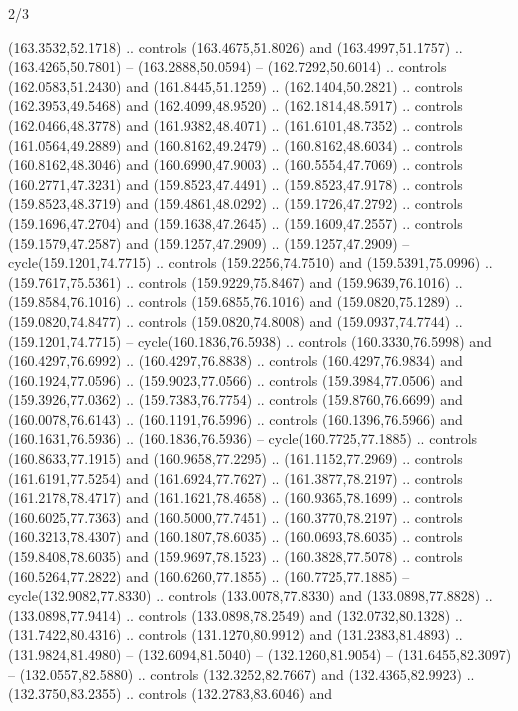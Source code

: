 \begin{flagdescription}{2/3}
\begin{scope}[xshift=0.5\flaglength,yshift=0.5\flagwidth,scale=\flagwidth/180]
\begin{scope}[y=0.8pt, x=0.8pt, yscale=-1,shift={(-168.75,-108.75)}]
  (163.3532,52.1718) .. controls (163.4675,51.8026) and (163.4997,51.1757) ..
  (163.4265,50.7801) -- (163.2888,50.0594) -- (162.7292,50.6014) .. controls
  (162.0583,51.2430) and (161.8445,51.1259) .. (162.1404,50.2821) .. controls
  (162.3953,49.5468) and (162.4099,48.9520) .. (162.1814,48.5917) .. controls
  (162.0466,48.3778) and (161.9382,48.4071) .. (161.6101,48.7352) .. controls
  (161.0564,49.2889) and (160.8162,49.2479) .. (160.8162,48.6034) .. controls
  (160.8162,48.3046) and (160.6990,47.9003) .. (160.5554,47.7069) .. controls
  (160.2771,47.3231) and (159.8523,47.4491) .. (159.8523,47.9178) .. controls
  (159.8523,48.3719) and (159.4861,48.0292) .. (159.1726,47.2792) .. controls
  (159.1696,47.2704) and (159.1638,47.2645) .. (159.1609,47.2557) .. controls
  (159.1579,47.2587) and (159.1257,47.2909) .. (159.1257,47.2909) --
  cycle(159.1201,74.7715) .. controls (159.2256,74.7510) and (159.5391,75.0996)
  .. (159.7617,75.5361) .. controls (159.9229,75.8467) and (159.9639,76.1016) ..
  (159.8584,76.1016) .. controls (159.6855,76.1016) and (159.0820,75.1289) ..
  (159.0820,74.8477) .. controls (159.0820,74.8008) and (159.0937,74.7744) ..
  (159.1201,74.7715) -- cycle(160.1836,76.5938) .. controls (160.3330,76.5998)
  and (160.4297,76.6992) .. (160.4297,76.8838) .. controls (160.4297,76.9834)
  and (160.1924,77.0596) .. (159.9023,77.0566) .. controls (159.3984,77.0506)
  and (159.3926,77.0362) .. (159.7383,76.7754) .. controls (159.8760,76.6699)
  and (160.0078,76.6143) .. (160.1191,76.5996) .. controls (160.1396,76.5966)
  and (160.1631,76.5936) .. (160.1836,76.5936) -- cycle(160.7725,77.1885) ..
  controls (160.8633,77.1915) and (160.9658,77.2295) .. (161.1152,77.2969) ..
  controls (161.6191,77.5254) and (161.6924,77.7627) .. (161.3877,78.2197) ..
  controls (161.2178,78.4717) and (161.1621,78.4658) .. (160.9365,78.1699) ..
  controls (160.6025,77.7363) and (160.5000,77.7451) .. (160.3770,78.2197) ..
  controls (160.3213,78.4307) and (160.1807,78.6035) .. (160.0693,78.6035) ..
  controls (159.8408,78.6035) and (159.9697,78.1523) .. (160.3828,77.5078) ..
  controls (160.5264,77.2822) and (160.6260,77.1855) .. (160.7725,77.1885) --
  cycle(132.9082,77.8330) .. controls (133.0078,77.8330) and (133.0898,77.8828)
  .. (133.0898,77.9414) .. controls (133.0898,78.2549) and (132.0732,80.1328) ..
  (131.7422,80.4316) .. controls (131.1270,80.9912) and (131.2383,81.4893) ..
  (131.9824,81.4980) -- (132.6094,81.5040) -- (132.1260,81.9054) --
  (131.6455,82.3097) -- (132.0557,82.5880) .. controls (132.3252,82.7667) and
  (132.4365,82.9923) .. (132.3750,83.2355) .. controls (132.2783,83.6046) and

\end{scope}
\end{scope}
\end{flagdescription}
